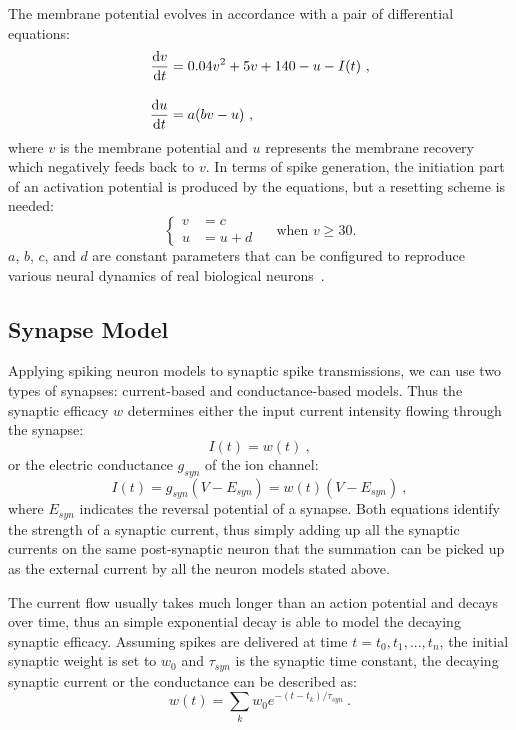 The membrane potential evolves in accordance with a pair of differential equations:
\begin{equation}
\begin{aligned}
\dfrac{\mathrm{d} v}{\mathrm{d} t} &= 0.04v^2 + 5v + 140 - u - I(t)~,\\[10pt]
\dfrac{\mathrm{d} u}{\mathrm{d} t} &= a(bv - u)~,
\end{aligned}
\end{equation}
where $v$ is the membrane potential and $u$ represents the membrane recovery which negatively feeds back to $v$.
In terms of spike generation, the initiation part of an activation potential is produced by the equations, but a resetting scheme is needed:
\begin{equation}
\left\{
\begin{aligned}
v &= c \\
u &= u + d
\end{aligned}
\right.
\textrm{~~~~when~} v \geq 30.
\end{equation}  
$a$, $b$, $c$, and $d$ are constant parameters that can be configured to reproduce various neural dynamics of real biological neurons~\cite{izhikevich2004model}.

\subsection{Synapse Model}
Applying spiking neuron models to synaptic spike transmissions, we can use two types of synapses: current-based and conductance-based models.
Thus the synaptic efficacy $w$ determines either the input current intensity flowing through the synapse: %
\begin{equation}
I(t) = w(t)~,
\end{equation}
or the electric conductance $g_{syn}$ of the ion channel: %
\begin{equation}
I(t) = g_{syn} (V-E_{syn}) = w(t) (V-E_{syn})~,
\end{equation}
where $E_{syn}$ indicates the reversal potential of a synapse.
Both equations identify the strength of a synaptic current, thus simply adding up all the synaptic currents on the same post-synaptic neuron that the summation can be picked up as the external current by all the neuron models stated above.

The current flow usually takes much longer than an action potential and decays over time, thus an simple exponential decay is able to model the decaying synaptic efficacy.
Assuming spikes are delivered at time $t={t_0, t_1, ..., t_n}$, the initial synaptic weight is set to $w_0$ and $\tau_{syn}$ is the synaptic time constant, the decaying synaptic current or the conductance can be described as:
\begin{equation}
w(t) = \sum_k w_0 e^{-(t-t_k)/\tau_{syn}}~.
\end{equation}

